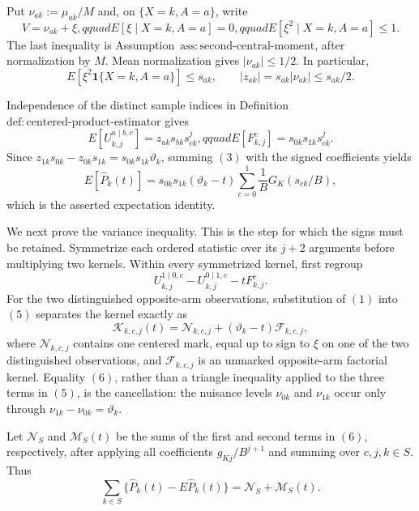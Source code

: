 Put \(\nu_{ak}:=\mu_{ak}/M\) and, on \(\{X=k,A=a\}\), write
\[
 V=\nu_{ak}+\xi,qquad E[\xi\mid X=k,A=a]=0,qquad
 E[\xi^2\mid X=k,A=a]\le1.
\tag{1}
\]
The last inequality is Assumption~\(\mathrm{ass:second\text{-}central\text{-}moment}\), after normalization by \(M\).  Mean normalization gives \(|\nu_{ak}|\le1/2\).  In particular,
\[
 E[\xi^2\mathbf 1\{X=k,A=a\}]\le s_{ak},
 \qquad |z_{ak}|=s_{ak}|\nu_{ak}|\le s_{ak}/2.
\tag{2}
\]

Independence of the distinct sample indices in Definition~\(\mathrm{def:centered\text{-}product\text{-}estimator}\) gives
\[
 E[U_{k,j}^{a\mid b,c}]=z_{ak}s_{bk}s_{ck}^{j},qquad
 E[F_{k,j}^{c}]=s_{0k}s_{1k}s_{ck}^{j}.
\tag{3}
\]
Since \(z_{1k}s_{0k}-z_{0k}s_{1k}=s_{0k}s_{1k}\vartheta_k\), summing \((3)\) with the signed coefficients yields
\[
 E[\widehat P_k(t)]
 =s_{0k}s_{1k}(\vartheta_k-t)
 \sum_{c=0}^1\frac1B G_K(s_{ck}/B),
\tag{4}
\]
which is the asserted expectation identity.

We next prove the variance inequality.  This is the step for which the signs must be retained.  Symmetrize each ordered statistic over its \(j+2\) arguments before multiplying two kernels.  Within every symmetrized kernel, first regroup
\[
 U_{k,j}^{1\mid0,c}-U_{k,j}^{0\mid1,c}-tF_{k,j}^{c}.
\tag{5}
\]
For the two distinguished opposite-arm observations, substitution of \((1)\) into \((5)\) separates the kernel exactly as
\[
 \mathcal K_{k,c,j}(t)=\mathcal N_{k,c,j}
 +(\vartheta_k-t)\mathcal F_{k,c,j},
\tag{6}
\]
where \(\mathcal N_{k,c,j}\) contains one centered mark, equal up to sign to \(\xi\) on one of the two distinguished observations, and \(\mathcal F_{k,c,j}\) is an unmarked opposite-arm factorial kernel.  Equality \((6)\), rather than a triangle inequality applied to the three terms in \((5)\), is the cancellation: the nuisance levels \(\nu_{0k}\) and \(\nu_{1k}\) occur only through \(\nu_{1k}-\nu_{0k}=\vartheta_k\).

Let \(\mathcal N_S\) and \(\mathcal M_S(t)\) be the sums of the first and second terms in \((6)\), respectively, after applying all coefficients \(g_{Kj}/B^{j+1}\) and summing over \(c,j,k\in S\).  Thus
\[
 \sum_{k\in S}\{\widehat P_k(t)-E\widehat P_k(t)\}
 =\mathcal N_S+\mathcal M_S(t).
\tag{7}
\]

